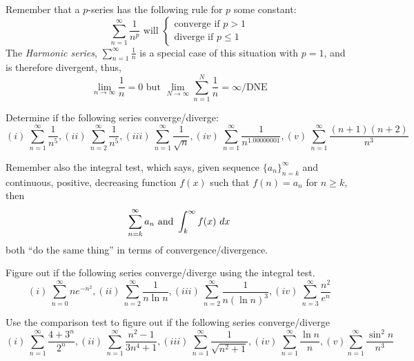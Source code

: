 \documentclass[12pt, a4paper]{article}
\begin{document}
\vspace{-2in}
\begin{defi}
  Remember that a \(p\)-series has the following rule for \(p\) some constant: \[
    \sum_{n=1}^\infty \frac{1}{n^p} \text{ will }
    \begin{cases}
      \text{converge if }p>1\\
      \text{diverge if }p\leq 1
    \end{cases}
  \]
  The \emph{Harmonic series}, \(\sum_{n=1}^\infty \frac{1}{n}\) is a
  special case of this situation with \(p=1\), and is therefore
  divergent, thus, \[
    \lim_{n \to \infty} \frac{1}{n} = 0 \text{ but } \lim_{N \to
      \infty} \sum_{n=1}^N \frac{1}{n} = \infty / \text{DNE}
  \]
\end{defi}
\vspace{-1in}
\begin{ex}
  Determine if the following series converge/diverge: \[
    (i)\ \sum_{n=1}^\infty \frac{1}{n^5}, (ii)\ \sum_{n=2}^\infty
    \frac{1}{n^5}, (iii)\ \sum_{n=1}^\infty \frac{1}{\sqrt{n}}, (iv)\
    \sum_{n=1}^\infty \frac{1}{n^{1.00000001}}, (v)\ \sum_{n=1}^\infty \frac{(n+1)(n+2)}{n^3}
  \]
\end{ex}
\vspace{-2.3in}
\begin{thrm}
  Remember also the integral test, which says, given sequence
  \(\{a_n\}_{n=k}^\infty\) and continuous, positive, decreasing
  function \(f(x)\) such that \(f(n)=a_n\) for \(n \geq k\), then \[
    \sum_{n=k}^\infty a_n \text{ and }
    \int_k^\infty f(x) \ d x 
  \]
  both ``do the same thing'' in terms of convergence/divergence.
\end{thrm}
\vspace{-1in}
\begin{ex}
  Figure out if the following series converge/diverge using the
  integral test.\[
    (i)\ \sum_{n=0}^\infty ne^{-n^2}, (ii)\
    \sum_{n=2}^\infty\frac{1}{n\ln n}, (iii)\ \sum_{n=2}^\infty
    \frac{1}{n(\ln n)^3}, (iv)\ \sum_{n=3}^\infty \frac{n^2}{e^n}
  \]
\end{ex}
\vspace{-2in}
\begin{ex}
  Use the comparison test to figure out if the following series
  converge/diverge \[
    (i)\ \sum_{n=1}^\infty \frac{4+3^n}{2^n}, (ii)\ \sum_{n=1}^\infty
    \frac{n^2-1}{3n^4+1}, (iii)\ \sum_{n=1}^\infty
    \frac{1}{\sqrt{n^2+1}}, (iv)\ \sum_{n=1}^\infty \frac{\ln n}{n},
    (v) \sum_{n=1}^\infty \frac{\sin^2 n}{n^3}
  \]
\end{ex}
\end{document}
